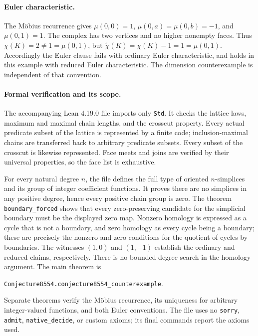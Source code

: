 \documentclass[11pt]{article}
\begin{document}
\paragraph{Euler characteristic.}
The M\"obius recurrence gives
$\mu(0,0)=1$, $\mu(0,a)=\mu(0,b)=-1$, and $\mu(0,1)=1$.
The complex has two vertices and no higher nonempty faces.  Thus
$\chi(K)=2\ne1=\mu(0,1)$, but
$\widetilde\chi(K)=\chi(K)-1=1=\mu(0,1)$.
Accordingly the Euler clause fails with ordinary Euler characteristic, and
holds in this example with reduced Euler characteristic.  The dimension
counterexample is independent of that convention.

\paragraph{Formal verification and its scope.}
The accompanying Lean 4.19.0 file imports only \texttt{Std}.  It checks the
lattice laws, maximum and maximal chain lengths, and the crosscut property.
Every actual predicate subset of the lattice is represented by a finite
code; inclusion-maximal chains are transferred back to arbitrary predicate
subsets.  Every subset of the crosscut is likewise represented.  Face meets
and joins are verified by their universal properties, so the face list is
exhaustive.

For every natural degree $n$, the file defines the full type of oriented
$n$-simplices and its group of integer coefficient functions.  It proves
there are no simplices in any positive degree, hence every positive chain
group is zero.  The theorem \texttt{boundary\_forced} shows that every
zero-preserving candidate for the simplicial boundary must be the displayed
zero map.  Nonzero homology is expressed as a cycle that is not a boundary,
and zero homology as every cycle being a boundary; these are precisely the
nonzero and zero conditions for the quotient of cycles by boundaries.
The witnesses $(1,0)$ and $(1,-1)$ establish the ordinary and reduced claims,
respectively.  There is no bounded-degree search in the homology argument.
The main theorem is
\begin{center}
\texttt{Conjecture8554.conjecture8554\_counterexample}.
\end{center}
Separate theorems verify the M\"obius recurrence, its uniqueness for arbitrary
integer-valued functions, and both Euler conventions.  The file uses no
\texttt{sorry}, \texttt{admit}, \texttt{native\_decide}, or custom axioms;
its final commands report the axioms used.
\end{document}
